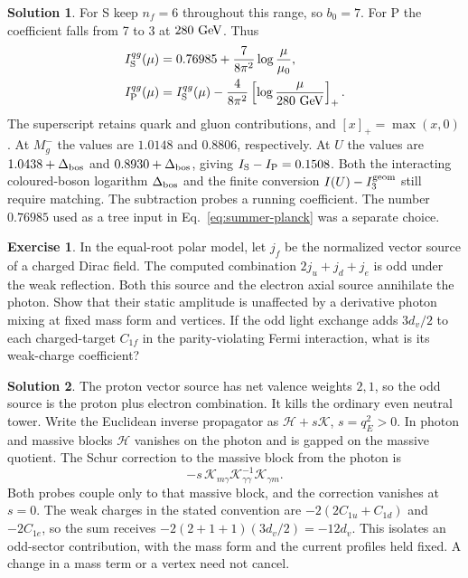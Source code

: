 \documentclass[10pt]{article}
\theoremstyle{definition}
\newtheorem{exercise}{Exercise}
\newtheorem{solution}{Solution}
\begin{document}
\begin{solution}
For S keep \(n_f=6\) throughout this range, so \(b_0=7\). For P the coefficient falls from 7 to 3 at \(280\ {\rm GeV}\). Thus
\begin{equation}
 \begin{aligned}
 I_{\rm S}^{qg}(\mu)&=0.76985+\frac7{8\pi^2}\log\frac{\mu}{\mu_0},\\
 I_{\rm P}^{qg}(\mu)&=I_{\rm S}^{qg}(\mu)
          -\frac4{8\pi^2}\left[\log\frac{\mu}{280\ {\rm GeV}}\right]_+ .
 \end{aligned}
\end{equation}
The superscript retains quark and gluon contributions, and \([x]_+=\max(x,0)\). At \(M_g^-\) the values are \(1.0148\) and \(0.8806\), respectively. At \(U\) the values are \(1.0438+\Delta_{\rm bos}\) and \(0.8930+\Delta_{\rm bos}\), giving \(I_{\rm S}-I_{\rm P}=0.1508\). Both the interacting coloured-boson logarithm \(\Delta_{\rm bos}\) and the finite conversion \(I(U)-I_3^{\rm geom}\) still require matching. The subtraction probes a running coefficient. The number \(0.76985\) used as a tree input in Eq.~\eqref{eq:summer-planck} was a separate choice.
\end{solution}

\begin{exercise}
In the equal-root polar model, let \(j_f\) be the normalized vector source of a charged Dirac field. The computed combination \(2j_u+j_d+j_e\) is odd under the weak reflection. Both this source and the electron axial source annihilate the photon. Show that their static amplitude is unaffected by a derivative photon mixing at fixed mass form and vertices. If the odd light exchange adds \(3d_v/2\) to each charged-target \(C_{1f}\) in the parity-violating Fermi interaction, what is its weak-charge coefficient?
\end{exercise}

\begin{solution}
The proton vector source has net valence weights \(2,1\), so the odd source is the proton plus electron combination. It kills the ordinary even neutral tower. Write the Euclidean inverse propagator as \(\mathcal H+s\mathcal K\), \(s=q_E^2>0\). In photon and massive blocks \(\mathcal H\) vanishes on the photon and is gapped on the massive quotient. The Schur correction to the massive block from the photon is
\begin{equation}
 -s\,\mathcal K_{m\gamma}\mathcal K_{\gamma\gamma}^{-1}
                        \mathcal K_{\gamma m}.
\end{equation}
Both probes couple only to that massive block, and the correction vanishes at \(s=0\). The weak charges in the stated convention are \(-2(2C_{1u}+C_{1d})\) and \(-2C_{1e}\), so the sum receives \(-2(2+1+1)(3d_v/2)=-12d_v\). This isolates an odd-sector contribution, with the mass form and the current profiles held fixed. A change in a mass term or a vertex need not cancel.
\end{solution}
\end{document}
